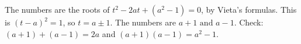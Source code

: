 The numbers are the roots of $t^2-2at+(a^2-1)=0$, by Vieta's formulas. This is $(t-a)^2=1$, so $t=a\pm1$. The numbers are $\boxed{a+1\text{ and }a-1}$. Check: $(a+1)+(a-1)=2a$ and $(a+1)(a-1)=a^2-1$.

